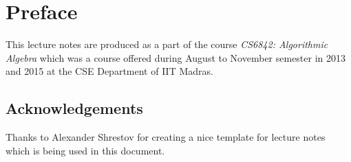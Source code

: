 \chapter*{Preface}

This lecture notes are produced as a part of the course \textit{CS6842: Algorithmic Algebra} which was a course offered during August to November semester in 2013 and 2015 at the CSE Department of IIT Madras.

\section*{Acknowledgements}
Thanks to Alexander Shrestov for creating a nice template for lecture notes which is being used in this document.
